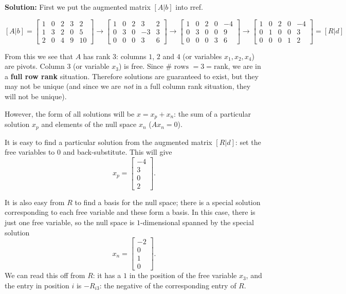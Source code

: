 \documentclass[11pt]{article}
\begin{document}
\begin{enumerate}
\textbf{Solution:} First we put the augmented matrix $[A | b]$ into rref.

\[  [A | b] = \begin{bmatrix} 1 & 0 & 2 & 3 & 2 \\ 1 & 3& 2 & 0 & 5 \\2 & 0 &4 & 9 & 10\end{bmatrix} \to  \begin{bmatrix} 1 & 0 & 2 & 3 & 2 \\ 0 & 3& 0 & -3 & 3 \\0 & 0 &0 & 3 & 6\end{bmatrix} \to  \begin{bmatrix} 1 & 0 & 2 & 0 & -4 \\ 0 & 3& 0 & 0 & 9 \\0 & 0 &0 & 3 & 6\end{bmatrix} \to  \begin{bmatrix} 1 & 0 & 2 & 0 & -4 \\ 0 & 1& 0 & 0 & 3 \\0 & 0 &0 & 1 & 2\end{bmatrix} = [R| d] \]

From this we see that $A$ has rank $3$: columns $1$, $2$ and $4$ (or variables $x_1, x_2, x_4$) are pivots.  Column $3$ (or variable $x_3$) is free.  Since $\# \text{ rows } = 3 = \text{rank}$, we are in a \textbf{full row rank} situation.  Therefore solutions are guaranteed to exist, but they may not be unique (and since we are \emph{not} in a full column rank situation, they will not be unique).

However, the form of all solutions will be $x = x_p + x_n$: the sum of a particular solution $x_p$ and elements of the null space $x_n$ ($A x_n = 0$).

It is easy to find a particular solution from the augmented matrix $[R | d]$: set the free variables to $0$ and back-substitute.  This will give
\[x_p = \begin{bmatrix} -4 \\ 3 \\ 0 \\ 2 \end{bmatrix}. \]

It is also easy from $R$ to find a basis for the null space; there is a special solution corresponding to each free variable and these form a basis.  In this case, there is just one free variable, so the null space is $1$-dimensional spanned by the special solution
\[ x_n = \begin{bmatrix} -2 \\ 0 \\ 1 \\ 0 \end{bmatrix}. \]
We can read this off from $R$: it has a $1$ in the position of the free variable $x_3$, and the entry in position $i$ is $-R_{i3}$: the negative of the corresponding entry of $R$.


\end{enumerate}
\end{document}
